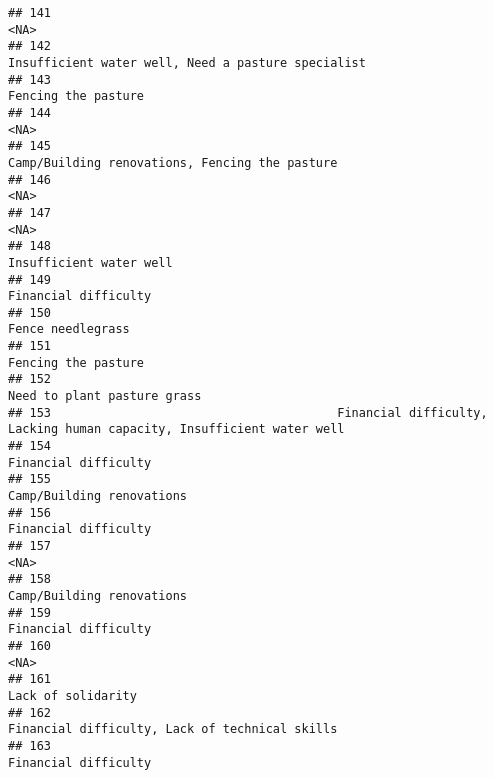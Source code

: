 \documentclass[
]{article}
\begin{document}
\begin{verbatim}
## 141                                                                                                         <NA>
## 142                                                           Insufficient water well, Need a pasture specialist
## 143                                                                                          Fencing the pasture
## 144                                                                                                         <NA>
## 145                                                               Camp/Building renovations, Fencing the pasture
## 146                                                                                                         <NA>
## 147                                                                                                         <NA>
## 148                                                                                      Insufficient water well
## 149                                                                                         Financial difficulty
## 150                                                                                            Fence needlegrass
## 151                                                                                          Fencing the pasture
## 152                                                                                  Need to plant pasture grass
## 153                                        Financial difficulty, Lacking human capacity, Insufficient water well
## 154                                                                                         Financial difficulty
## 155                                                                                    Camp/Building renovations
## 156                                                                                         Financial difficulty
## 157                                                                                                         <NA>
## 158                                                                                    Camp/Building renovations
## 159                                                                                         Financial difficulty
## 160                                                                                                         <NA>
## 161                                                                                           Lack of solidarity
## 162                                                               Financial difficulty, Lack of technical skills
## 163                                                                                         Financial difficulty

\end{verbatim}
\end{document}
